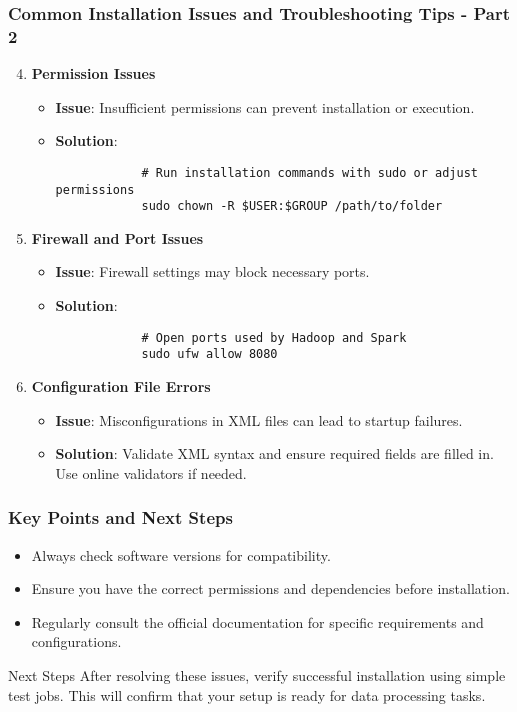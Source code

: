\documentclass{beamer}
\begin{document}
\begin{frame}[fragile]
    \frametitle{Common Installation Issues and Troubleshooting Tips - Part 2}
    \begin{enumerate}
        \setcounter{enumi}{3}
        \item \textbf{Permission Issues}
        \begin{itemize}
            \item \textbf{Issue}: Insufficient permissions can prevent installation or execution.
            \item \textbf{Solution}:
            \begin{lstlisting}
            # Run installation commands with sudo or adjust permissions
            sudo chown -R $USER:$GROUP /path/to/folder
            \end{lstlisting}
        \end{itemize}
        
        \item \textbf{Firewall and Port Issues}
        \begin{itemize}
            \item \textbf{Issue}: Firewall settings may block necessary ports.
            \item \textbf{Solution}:
            \begin{lstlisting}
            # Open ports used by Hadoop and Spark
            sudo ufw allow 8080
            \end{lstlisting}
        \end{itemize}
        
        \item \textbf{Configuration File Errors}
        \begin{itemize}
            \item \textbf{Issue}: Misconfigurations in XML files can lead to startup failures.
            \item \textbf{Solution}: Validate XML syntax and ensure required fields are filled in. Use online validators if needed.
        \end{itemize}
    \end{enumerate}
\end{frame}

\begin{frame}
    \frametitle{Key Points and Next Steps}
    \begin{itemize}
        \item Always check software versions for compatibility.
        \item Ensure you have the correct permissions and dependencies before installation.
        \item Regularly consult the official documentation for specific requirements and configurations.
    \end{itemize}
    
    \begin{block}{Next Steps}
        After resolving these issues, verify successful installation using simple test jobs. This will confirm that your setup is ready for data processing tasks.
    \end{block}
\end{frame}
\end{document}
